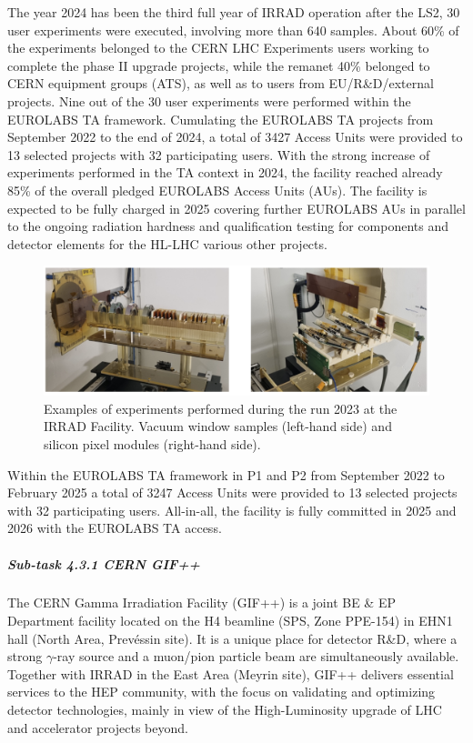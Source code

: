The year 2024 has been the third full year of IRRAD operation after the LS2, 30 user experiments were executed, involving more than 640 samples. About 60\% of the experiments belonged to the CERN LHC Experiments users working to complete the phase II upgrade projects, while the remanet 40\% belonged to CERN equipment groups (ATS), as well as to users from EU/R\&D/external projects. Nine out of the 30 user experiments were performed within the EUROLABS TA framework. Cumulating the EUROLABS TA projects from September 2022 to the end of 2024, a total of 3427 Access Units were provided to 13 selected projects with 32 participating users. With the strong increase of experiments performed in the TA context in 2024, the facility reached already 85\% of the overall pledged EUROLABS Access Units (AUs). The facility is expected to be fully charged in 2025 covering further EUROLABS AUs in parallel to the ongoing radiation hardness and qualification testing for components and detector elements for the HL-LHC various other projects.

\begin{figure}[!h]
    \centering
    \includegraphics[width=1\linewidth]{image7.png}
    \caption{Examples of experiments performed during the run 2023 at the IRRAD Facility. Vacuum window samples (left-hand side) and silicon pixel modules (right-hand side).
}
    \label{fig:4.3.1}
\end{figure}

Within the EUROLABS TA framework in P1 and P2 from September 2022 to February 2025 a total of 3247 Access Units were provided to 13 selected projects with 32 participating users. All-in-all, the facility is fully committed in 2025 and 2026 with the EUROLABS TA access. 

\subparagraph{Sub-task 4.3.1 CERN GIF++} \mbox{}
The CERN Gamma Irradiation Facility (GIF++) is a joint BE \& EP Department facility located on the H4 beamline (SPS, Zone PPE-154) in EHN1 hall (North Area, Prevéssin site). It is a unique place for detector R\&D, where a strong $\gamma$-ray source and a muon/pion particle beam 
are simultaneously available. Together with IRRAD in the East Area (Meyrin site), GIF++ delivers essential services to the HEP community, with the focus on validating and optimizing detector technologies, mainly in view of the High-Luminosity upgrade of LHC and accelerator projects beyond.

